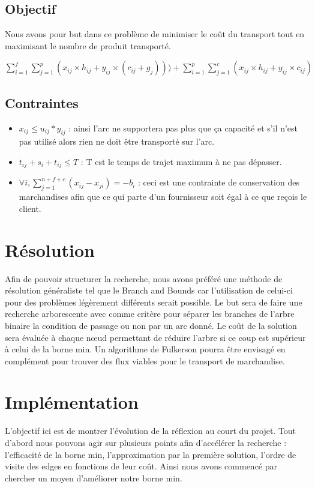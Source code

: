 \documentclass[french]{article}
\begin{document}
	\subsection{Objectif}
	Nous avons pour but dans ce problème de minimiser le coût du transport tout en maximisant le nombre de produit transporté.
	
	$\sum_{i=1}^{f} \sum_{j=1}^{p}(x_{ij} \times h_{ij} + y_{ij} \times (c_{ij} + g_{j}))) + \sum_{i=1}^{p} \sum_{j=1}^{c}(x_{ij} \times h_{ij} + y_{ij} \times c_{ij}) $
	
	\subsection{Contraintes}
	\begin{itemize}
		\item $x_{ij} \leq u_{ij} * y_{ij}$ : ainsi l'arc ne supportera pas plus que ça capacité et s'il n'est pas utilisé alors rien ne doit être transporté sur l'arc.
		\item $t_{ij} + s_{i} + t_{ij} \leq T$ : T est le temps de trajet maximum à ne pas dépasser. 
		\item $\forall i, \sum_{j=1}^{n+f+c}(x_{ij} - x_{ji}) = - b_{i}$ : ceci est une contrainte de conservation des marchandises afin que ce qui parte d'un fournisseur soit égal à ce que reçois le client.
	\end{itemize}
	
\section{Résolution}
Afin de pouvoir structurer la recherche, nous avons préféré une méthode de résolution généraliste tel que le Branch and Bounds car l'utilisation de celui-ci pour des problèmes légèrement différents serait possible. Le but sera de faire une recherche arborescente avec comme critère pour séparer les branches de l'arbre binaire la condition de passage ou non par un arc donné. Le coût de la solution sera évaluée à chaque nœud permettant de réduire l'arbre si ce coup est supérieur à celui de la borne min. 
Un algorithme de Fulkerson pourra être envisagé en complément pour trouver des flux viables pour le transport de marchandise.


\section{Implémentation}
L'objectif ici est de montrer l'évolution de la réflexion au court du projet. Tout d'abord nous pouvons agir sur plusieurs points afin d'accélérer la recherche : l'efficacité de la borne min, l'approximation par la première solution, l'ordre de visite des edges en fonctions de leur coût. Ainsi nous avons commencé par chercher un moyen d'améliorer notre borne min.
\end{document}
